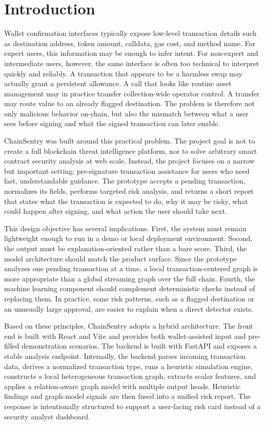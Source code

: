 \documentclass[11pt]{article}
\begin{document}
\section{Introduction}

Wallet confirmation interfaces typically expose low-level transaction details such as destination address, token amount, calldata, gas cost, and method name. For expert users, this information may be enough to infer intent. For non-expert and intermediate users, however, the same interface is often too technical to interpret quickly and reliably. A transaction that appears to be a harmless swap may actually grant a persistent allowance. A call that looks like routine asset management may in practice transfer collection-wide operator control. A transfer may route value to an already flagged destination. The problem is therefore not only malicious behavior on-chain, but also the mismatch between what a user sees before signing and what the signed transaction can later enable.

ChainSentry was built around this practical problem. The project goal is not to create a full blockchain threat intelligence platform, nor to solve arbitrary smart contract security analysis at web scale. Instead, the project focuses on a narrow but important setting: pre-signature transaction assistance for users who need fast, understandable guidance. The prototype accepts a pending transaction, normalizes its fields, performs targeted risk analysis, and returns a short report that states what the transaction is expected to do, why it may be risky, what could happen after signing, and what action the user should take next.

This design objective has several implications. First, the system must remain lightweight enough to run in a demo or local deployment environment. Second, the output must be explanation-oriented rather than a bare score. Third, the model architecture should match the product surface. Since the prototype analyzes one pending transaction at a time, a local transaction-centered graph is more appropriate than a global streaming graph over the full chain. Fourth, the machine learning component should complement deterministic checks instead of replacing them. In practice, some risk patterns, such as a flagged destination or an unusually large approval, are easier to explain when a direct detector exists.

Based on these principles, ChainSentry adopts a hybrid architecture. The front end is built with React and Vite and provides both wallet-assisted input and pre-filled demonstration scenarios. The backend is built with FastAPI and exposes a stable analysis endpoint. Internally, the backend parses incoming transaction data, derives a normalized transaction type, runs a heuristic simulation engine, constructs a local heterogeneous transaction graph, extracts scalar features, and applies a relation-aware graph model with multiple output heads. Heuristic findings and graph-model signals are then fused into a unified risk report. The response is intentionally structured to support a user-facing risk card instead of a security analyst dashboard.
\end{document}
